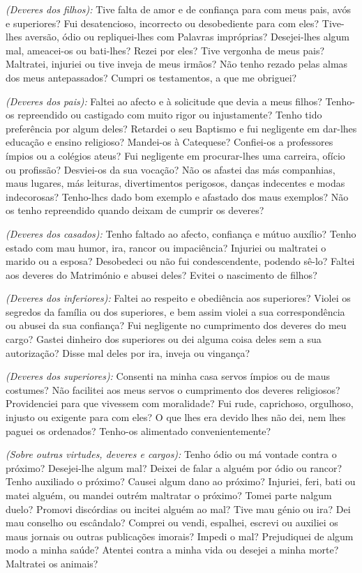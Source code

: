 \emph{(Deveres dos filhos):} Tive falta de amor e de confiança para com meus pais, avós e superiores? Fui desatencioso, incorrecto ou desobediente para com eles? Tive-lhes aversão, ódio ou repliquei-lhes com Palavras impróprias? Desejei-lhes algum mal, ameacei-os ou bati-lhes? Rezei por eles? Tive vergonha de meus pais? Maltratei, injuriei ou tive inveja de meus irmãos? Não tenho rezado pelas almas dos meus antepassados? Cumpri os testamentos, a que me obriguei?

\emph{(Deveres dos pais):} Faltei ao afecto e à solicitude que devia a meus filhos? Tenho-os repreendido ou castigado com muito rigor ou injustamente? Tenho tido preferência por algum deles? Retardei o seu Baptismo e fui negligente em dar-lhes educação e ensino religioso? Mandei-os à Catequese? Confiei-os a professores ímpios ou a colégios ateus? Fui negligente em procurar-lhes uma carreira, ofício ou profissão? Desviei-os da sua vocação? Não os afastei das más companhias, maus lugares, más leituras, divertimentos perigosos, danças indecentes e modas indecorosas? Tenho-lhcs dado bom exemplo e afastado dos maus exemplos? Não os tenho repreendido quando deixam de cumprir os deveres?

\emph{(Deveres dos casados):} Tenho faltado ao afecto, confiança e mútuo auxílio? Tenho estado com mau humor, ira, rancor ou impaciência? Injuriei ou maltratei o marido ou a esposa? Desobedeci ou não fui condescendente, podendo sê-lo? Faltei aos deveres do Matrimónio e abusei deles? Evitei o nascimento de filhos?

\emph{(Deveres dos inferiores):} Faltei ao respeito e obediência aos superiores? Violei os segredos da família ou dos superiores, e bem assim violei a sua correspondência ou abusei da sua confiança? Fui negligente no cumprimento dos deveres do meu cargo? Gastei dinheiro dos superiores ou dei alguma coisa deles sem a sua autorização? Disse mal deles por ira, inveja ou vingança?

\emph{(Deveres dos superiores):} Consenti na minha casa servos ímpios ou de maus costumes? Não facilitei aos meus servos o cumprimento dos deveres religiosos? Providenciei para que vivessem com moralidade? Fui rude, caprichoso, orgulhoso, injusto ou exigente para com eles? O que lhes era devido lhes não dei, nem lhes paguei os ordenados? Tenho-os alimentado convenientemente?

\emph{(Sobre outras virtudes, deveres e cargos):} Tenho ódio ou má vontade contra o próximo? Desejei-lhe algum mal? Deixei de falar a alguém por ódio ou rancor? Tenho auxiliado o próximo? Causei algum dano ao próximo? Injuriei, feri, bati ou matei alguém, ou mandei outrém maltratar o próximo? Tomei parte nalgum duelo? Promovi discórdias ou incitei alguém ao mal? Tive mau génio ou ira? Dei mau conselho ou escândalo? Comprei ou vendi, espalhei, escrevi ou auxiliei os maus jornais ou outras publicações imorais? Impedi o mal? Prejudiquei de algum modo a minha saúde? Atentei contra a minha vida ou desejei a minha morte? Maltratei os animais?

